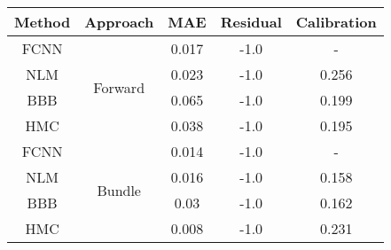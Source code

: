 \documentclass[convert={outext=.png}]{standalone}
\begin{document}
\centering
\label{tab:experimental_results}

\begin{tabular}{c c c c c}

\hline
\hline
Method & Approach &  MAE & Residual & Calibration \\ \hline
 FCNN & \multirow{4}{*}{Forward} & 0.017 & -1.0 & - \\
 NLM &  & 0.023 & -1.0 & 0.256 \\
 BBB &  & 0.065 & -1.0 & 0.199 \\
 HMC &  & 0.038 & -1.0 & 0.195 \\
 \hline
 FCNN & \multirow{4}{*}{Bundle} & 0.014 & -1.0 & - \\
 NLM &  & 0.016 & -1.0 & 0.158 \\
 BBB &  & 0.03 & -1.0 & 0.162 \\
 HMC &  & 0.008 & -1.0 & 0.231 \\
\hline
\hline
\end{tabular}
\end{document}
